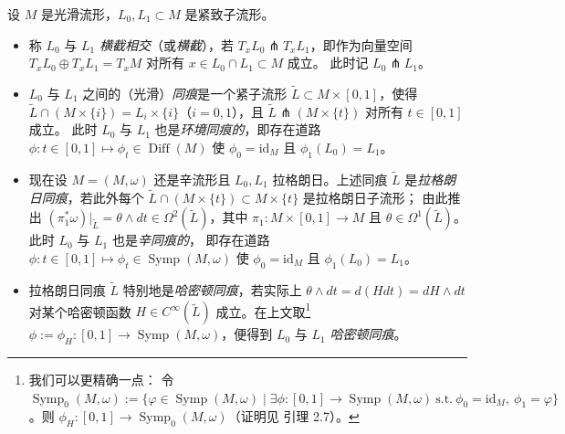 \begin{Def}\label{def:5.5}
设 $M$ 是光滑流形，$L_0,L_1\subset M$ 是紧致子流形。
\begin{itemize}
  \item 称 $L_0$ 与 $L_1$ \emph{横截相交}（或\emph{横截}），若
  $T_xL_0\pitchfork T_xL_1$，即作为向量空间
  $T_xL_0\oplus T_xL_1=T_xM$ 对所有 $x\in L_0\cap L_1\subset M$ 成立。
  此时记 $L_0\pitchfork L_1$。
  \item $L_0$ 与 $L_1$ 之间的（光滑）\emph{同痕}是一个紧子流形
  $\widetilde L\subset M\times[0,1]$，使得
  $\widetilde L\cap(M\times\{i\})=L_i\times\{i\}$（$i=0,1$），且
  $\widetilde L\pitchfork(M\times\{t\})$ 对所有 $t\in[0,1]$ 成立。
  此时 $L_0$ 与 $L_1$ 也是\emph{环境同痕的}，即存在道路
  $\phi:t\in[0,1]\mapsto\phi_t\in\operatorname{Diff}(M)$ 使
  $\phi_0=\mathrm{id}_M$ 且 $\phi_1(L_0)=L_1$。
  \item 现在设 $M=(M,\omega)$ 还是辛流形且 $L_0,L_1$ 拉格朗日。上述同痕
  $\widetilde L$ 是\emph{拉格朗日同痕}，若此外每个
  $\widetilde L\cap(M\times\{t\})\subset M\times\{t\}$ 是拉格朗日子流形；
  由此推出 $(\pi_1^*\omega)|_{\widetilde L}=\theta\wedge dt\in
  \Omega^2(\widetilde L)$，其中 $\pi_1:M\times[0,1]\to M$ 且
  $\theta\in\Omega^1(\widetilde L)$。此时 $L_0$ 与 $L_1$ 也是\emph{辛同痕的}，
  即存在道路 $\phi:t\in[0,1]\mapsto\phi_t\in\operatorname{Symp}(M,\omega)$ 使
  $\phi_0=\mathrm{id}_M$ 且 $\phi_1(L_0)=L_1$。
  \item 拉格朗日同痕 $\widetilde L$ 特别地是\emph{哈密顿同痕}，若实际上
  $\theta\wedge dt=d(Hdt)=dH\wedge dt$ 对某个哈密顿函数
  $H\in C^\infty(\widetilde L)$ 成立。在上文取\footnote{我们可以更精确一点：
  令 $\operatorname{Symp}_0(M,\omega):=\{\varphi\in\operatorname{Symp}(M,\omega)\mid
  \exists\phi:[0,1]\to\operatorname{Symp}(M,\omega)\ \text{s.t.}\
  \phi_0=\mathrm{id}_M,\ \phi_1=\varphi\}$。则
  $\phi_H:[0,1]\to\operatorname{Symp}_0(M,\omega)$（证明见 \cite{Mer14} 引理 2.7）。}
  $\phi:=\phi_H:[0,1]\to\operatorname{Symp}(M,\omega)$，便得到 $L_0$ 与 $L_1$
  \emph{哈密顿同痕}。
\end{itemize}
\end{Def}


